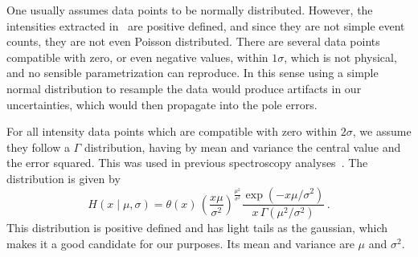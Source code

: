 One usually assumes data points to be normally distributed. However, the intensities extracted in~\cite{Ablikim:2015umt,Ablikim:2018izx} are positive defined, and since they are not simple event counts, they are not even Poisson distributed. There are several data points compatible with zero, or even negative values, within $1\sigma$, which is not physical, and no sensible parametrization can reproduce. In this sense using a simple normal distribution to resample the data would produce artifacts in our uncertainties, which would then propagate into the pole errors.

For all intensity data points which are compatible with zero within $2 \sigma$, we assume they follow a $\Gamma$ distribution, having by mean and variance the central value and the error squared. This was used in previous spectroscopy analyses~\cite{Blin:2016dlf}. The distribution is given by
\begin{equation}
H\left(x \mid \mu, \sigma\right)=\theta(x)\,\left(\frac{x \mu}{\sigma^{2}}\right)^{\frac{\mu^{2}}{\sigma^{2}}} \frac{\exp \left(-x \mu / \sigma^{2}\right)}{x\, \Gamma\!\left(\mu^{2} / \sigma^{2}\right)}\,.
\end{equation}
This distribution is positive defined and has light tails as the gaussian, which makes it a good candidate for our purposes. Its mean and variance are $\mu$ and $\sigma^2$.
